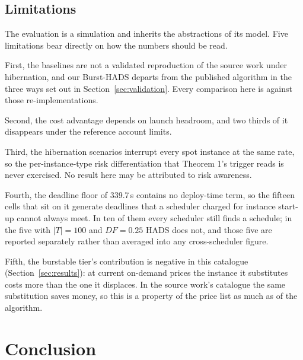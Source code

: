 \documentclass[conference]{IEEEtran}
\begin{document}
\subsection{Limitations}

The evaluation is a simulation and inherits the abstractions of its model. Five
limitations bear directly on how the numbers should be read.

First, the baselines are not a validated reproduction of the source work under
hibernation, and our Burst-HADS departs from the published algorithm in the
three ways set out in Section~\ref{sec:validation}. Every comparison here is
against those re-implementations.

Second, the cost advantage depends on launch headroom, and two thirds of it
disappears under the reference account limits.

Third, the hibernation scenarios interrupt every spot instance at the same
rate, so the per-instance-type risk differentiation that Theorem 1's trigger
reads is never exercised. No result here may be attributed to risk awareness.

Fourth, the deadline floor of 339.7\,s contains no deploy-time term, so the
fifteen cells that sit on it generate deadlines that a scheduler charged for
instance start-up cannot always meet. In ten of them every scheduler still
finds a schedule; in the five with $|T| = 100$ and $\mathit{DF} = 0.25$ HADS
does not, and those five are reported separately rather than averaged into any
cross-scheduler figure.

Fifth, the burstable tier's contribution is negative in this catalogue
(Section~\ref{sec:results}): at current on-demand prices the instance it
substitutes costs more than the one it displaces. In the source work's
catalogue the same substitution saves money, so this is a property of the price
list as much as of the algorithm.

\section{Conclusion}
\end{document}
